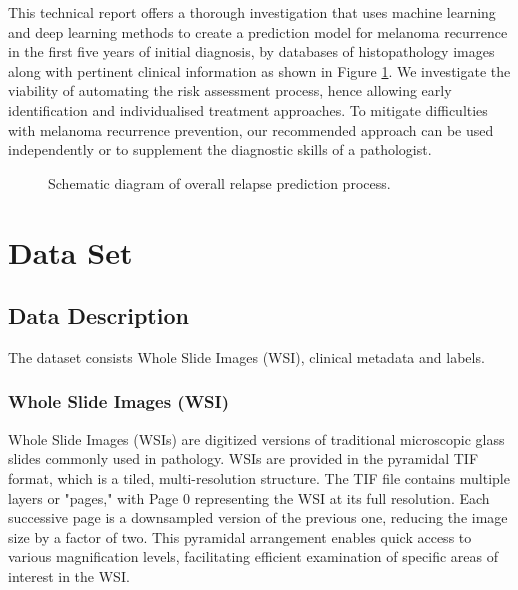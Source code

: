 \documentclass[conference]{IEEEtran}
\begin{document}
This technical report offers a thorough investigation that uses machine learning and deep learning methods to create a prediction model for melanoma recurrence in the first five years of initial diagnosis, by databases of histopathology images along with pertinent clinical information as shown in Figure \ref{fig:aim}. We investigate the viability of automating the risk assessment process, hence allowing early identification and individualised treatment approaches. To mitigate difficulties with melanoma recurrence prevention, our recommended approach can be used independently or to supplement the diagnostic skills of a pathologist.
\begin{figure}[h!]
  \centering
    
  \caption{Schematic diagram of overall relapse prediction process.}
  \label{fig:aim}
\end{figure}

\section{Data Set}

\subsection{Data Description}
The dataset consists Whole Slide Images (WSI), clinical metadata and labels.

\subsubsection{Whole Slide Images (WSI)}
Whole Slide Images (WSIs) are digitized versions of traditional microscopic glass slides commonly used in pathology. WSIs are provided in the pyramidal TIF format, which is a tiled, multi-resolution structure. The TIF file contains multiple layers or "pages," with Page 0 representing the WSI at its full resolution. Each successive page is a downsampled version of the previous one, reducing the image size by a factor of two. This pyramidal arrangement enables quick access to various magnification levels, facilitating efficient examination of specific areas of interest in the WSI.
\end{document}

